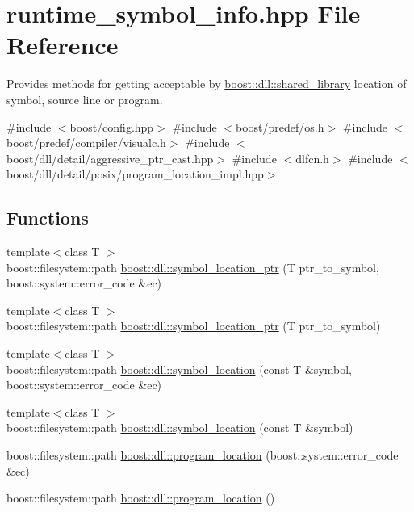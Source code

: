 \hypertarget{a00266}{}\section{runtime\+\_\+symbol\+\_\+info.\+hpp File Reference}
\label{a00266}


Provides methods for getting acceptable by \hyperlink{a01708}{boost\+::dll\+::shared\+\_\+library} location of symbol, source line or program.  


{\ttfamily \#include $<$boost/config.\+hpp$>$}\newline
{\ttfamily \#include $<$boost/predef/os.\+h$>$}\newline
{\ttfamily \#include $<$boost/predef/compiler/visualc.\+h$>$}\newline
{\ttfamily \#include $<$boost/dll/detail/aggressive\+\_\+ptr\+\_\+cast.\+hpp$>$}\newline
{\ttfamily \#include $<$dlfcn.\+h$>$}\newline
{\ttfamily \#include $<$boost/dll/detail/posix/program\+\_\+location\+\_\+impl.\+hpp$>$}\newline
\subsection*{Functions}
\begin{DoxyCompactItemize}
\item 
{\footnotesize template$<$class T $>$ }\\boost\+::filesystem\+::path \hyperlink{a00266_a1a70f04489d9c27a7c12a663681a2557}{boost\+::dll\+::symbol\+\_\+location\+\_\+ptr} (T ptr\+\_\+to\+\_\+symbol, boost\+::system\+::error\+\_\+code \&ec)
\item 
{\footnotesize template$<$class T $>$ }\\boost\+::filesystem\+::path \hyperlink{a00266_ae6aac347e0e9cbae31c26f52ebb0ce85}{boost\+::dll\+::symbol\+\_\+location\+\_\+ptr} (T ptr\+\_\+to\+\_\+symbol)
\item 
{\footnotesize template$<$class T $>$ }\\boost\+::filesystem\+::path \hyperlink{a00266_a91b824b8cdf4e600546d636fd09672f9}{boost\+::dll\+::symbol\+\_\+location} (const T \&symbol, boost\+::system\+::error\+\_\+code \&ec)
\item 
{\footnotesize template$<$class T $>$ }\\boost\+::filesystem\+::path \hyperlink{a00266_ada9f78ac87565980f6c639f3b2e30892}{boost\+::dll\+::symbol\+\_\+location} (const T \&symbol)
\item 
boost\+::filesystem\+::path \hyperlink{a00266_a2e682f5c6e64ed097bf29e4490334ddf}{boost\+::dll\+::program\+\_\+location} (boost\+::system\+::error\+\_\+code \&ec)
\item 
boost\+::filesystem\+::path \hyperlink{a00266_af400fcad737237876fc4a30969936063}{boost\+::dll\+::program\+\_\+location} ()
\end{DoxyCompactItemize}


